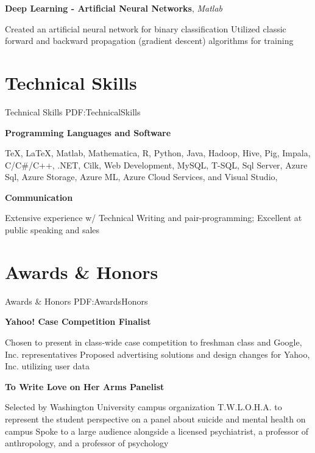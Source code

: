 \documentclass[a4paper,10pt,oneside]{article}
\begin{document}
\begin{body}
\EntryGap
\textbf{Deep Learning - Artificial Neural Networks},
\textit{Matlab}
\begin{detail}
\BulletItem
Created an artificial neural network for binary classification
\BulletItem
Utilized classic forward and backward propagation (gradient descent) algorithms for training
\end{detail}



\section
{Technical\newline
Skills}
{Technical Skills}
{PDF:TechnicalSkills}

\textbf{Programming Languages and Software}
\par
\begin{detail}
\BulletItem
{\TeX}, {\LaTeX}, Matlab, Mathematica, R, Python, Java, Hadoop, Hive, Pig, Impala, C/C\#/C++, .NET, Cilk, Web Development, MySQL, T-SQL, Sql Server, Azure Sql, Azure Storage, Azure ML, Azure Cloud Services, and Visual Studio, 
\end{detail}

\EntryGap
\textbf{Communication}
\begin{detail}
\BulletItem
Extensive experience w/ Technical Writing and pair-programming; Excellent at public speaking and sales
\end{detail}



\section
{Awards \&\newline
Honors}
{Awards \& Honors}
{PDF:AwardsHonors}

\textbf{Yahoo! Case Competition Finalist}
\hfill
{}
\begin{detail}
\BulletItem
Chosen to present in class-wide case competition to freshman class and Google, Inc. representatives 
\BulletItem 
Proposed advertising solutions and design changes for Yahoo, Inc. utilizing user data
\end{detail}

\EntryGap
\textbf{To Write Love on Her Arms Panelist}
\hfill
{}
\begin{detail}
\BulletItem
Selected by Washington University campus organization T.W.L.O.H.A. to represent the student perspective on a panel about suicide and mental health on campus
\BulletItem
Spoke to a large audience alongside a licensed psychiatrist, a professor of anthropology, and a professor of psychology
\end{detail}


\end{body}
\end{document}
